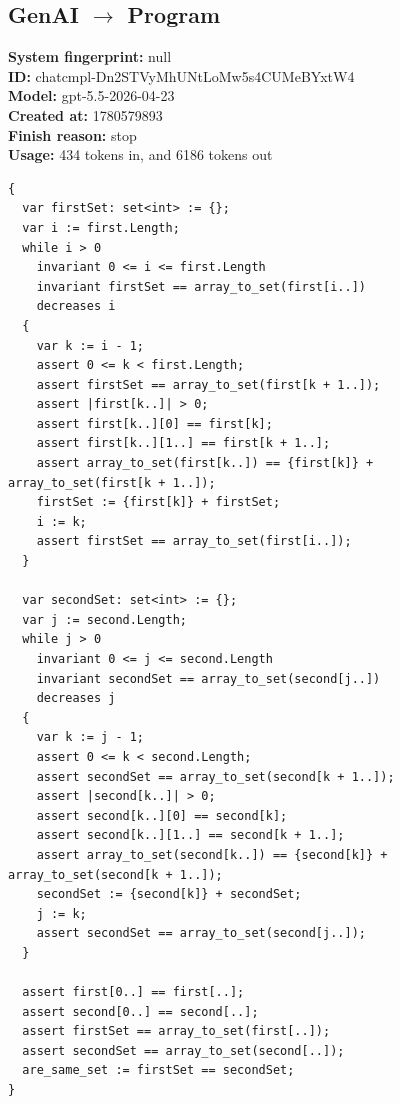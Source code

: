 \documentclass{article}
\begin{document}
\subsection*{GenAI $\rightarrow$ Program}
\textbf{System fingerprint: }null
\\\textbf{ID: }chatcmpl-Dn2STVyMhUNtLoMw5s4CUMeBYxtW4
\\\textbf{Model: }gpt-5.5-2026-04-23
\\\textbf{Created at: }1780579893
\\\textbf{Finish reason: }stop
\\\textbf{Usage: }434 tokens in, and 6186 tokens out
\begin{lstlisting}
{
  var firstSet: set<int> := {};
  var i := first.Length;
  while i > 0
    invariant 0 <= i <= first.Length
    invariant firstSet == array_to_set(first[i..])
    decreases i
  {
    var k := i - 1;
    assert 0 <= k < first.Length;
    assert firstSet == array_to_set(first[k + 1..]);
    assert |first[k..]| > 0;
    assert first[k..][0] == first[k];
    assert first[k..][1..] == first[k + 1..];
    assert array_to_set(first[k..]) == {first[k]} + array_to_set(first[k + 1..]);
    firstSet := {first[k]} + firstSet;
    i := k;
    assert firstSet == array_to_set(first[i..]);
  }

  var secondSet: set<int> := {};
  var j := second.Length;
  while j > 0
    invariant 0 <= j <= second.Length
    invariant secondSet == array_to_set(second[j..])
    decreases j
  {
    var k := j - 1;
    assert 0 <= k < second.Length;
    assert secondSet == array_to_set(second[k + 1..]);
    assert |second[k..]| > 0;
    assert second[k..][0] == second[k];
    assert second[k..][1..] == second[k + 1..];
    assert array_to_set(second[k..]) == {second[k]} + array_to_set(second[k + 1..]);
    secondSet := {second[k]} + secondSet;
    j := k;
    assert secondSet == array_to_set(second[j..]);
  }

  assert first[0..] == first[..];
  assert second[0..] == second[..];
  assert firstSet == array_to_set(first[..]);
  assert secondSet == array_to_set(second[..]);
  are_same_set := firstSet == secondSet;
}
\end{lstlisting}
\end{document}

